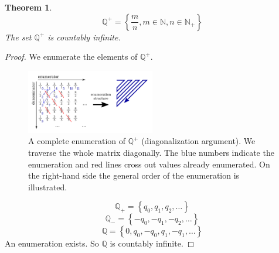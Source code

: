 \documentclass[a4paper,landscape,twocolumn]{article}
\newtheorem{theorem}{Theorem}
\newcommand\set[1]{\left\{#1\right\}}
\begin{document}
\begin{theorem}
  \[ \mathbb Q^+ = \set{\frac mn, m \in \mathbb N, n \in \mathbb N_+} \]
  The set $\mathbb Q^+$ is countably infinite.
\end{theorem}

\begin{proof}
  We enumerate the elements of $\mathbb Q^+$.

  \begin{figure}[!h]
    \begin{center}
      \includegraphics[width=0.5\textwidth]{img/enumeration_of_Q.pdf}
      \caption{
        A complete enumeration of $\mathbb Q^+$ (diagonalization argument).
        We traverse the whole matrix diagonally. The blue numbers indicate the
        enumeration and red lines cross out values already enumerated.
        On the right-hand side the general order of the enumeration is illustrated.
      }
    \end{center}
  \end{figure}

  \[ \mathbb Q_+ = \set{q_0, q_1, q_2, \ldots} \]
  \[ \mathbb Q_- = \set{-q_0, -q_1, -q_2, \ldots} \]
  \[ \mathbb Q = \set{0, q_0, -q_0, q_1, -q_1, \ldots} \]
  An enumeration exists. So $\mathbb Q$ is countably infinite.
\end{proof}
\end{document}
